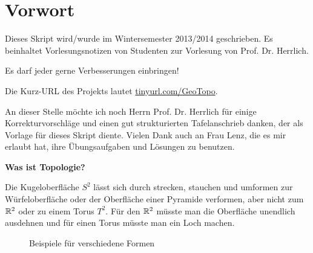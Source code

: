 \chapter*{Vorwort}
Dieses Skript wird/wurde im Wintersemester 2013/2014 geschrieben.
Es beinhaltet Vorlesungsnotizen von Studenten zur Vorlesung von
Prof. Dr. Herrlich.

Es darf jeder gerne Verbesserungen einbringen!

Die Kurz-URL des Projekts lautet \href{http://tinyurl.com/GeoTopo}{tinyurl.com/GeoTopo}.

An dieser Stelle möchte ich noch Herrn Prof. Dr. Herrlich 
für einige Korrekturvorschläge und einen gut strukturierten 
Tafelanschrieb danken, der als Vorlage für dieses Skript diente.
Vielen Dank auch an Frau Lenz, die es mir erlaubt hat, ihre 
Übungsaufgaben und Lösungen zu benutzen.


\textbf{Was ist Topologie?}

Die Kugeloberfläche $S^2$ lässt sich durch strecken, stauchen
und umformen zur Würfeloberfläche oder
der Oberfläche einer Pyramide verformen, aber nicht zum $\mdr^2$
oder zu einem Torus $T^2$. Für den $\mdr^2$ müsste man die Oberfläche
unendlich ausdehnen und für einen Torus müsste man ein Loch machen.

\begin{figure}[ht]
    \centering
    \subfloat[$S^2$]{
        
        \label{fig:s2}
    }%
    \subfloat[Würfel]{
        
        \label{fig:cube}
    }%
    \subfloat[Pyramide]{
        
        \label{fig:pyramide}
    }

    \subfloat[$\mdr^2$]{
        
        \label{fig:plane-r2}
    }%
    \label{Formen}
    \caption{Beispiele für verschiedene Formen}
\end{figure}
